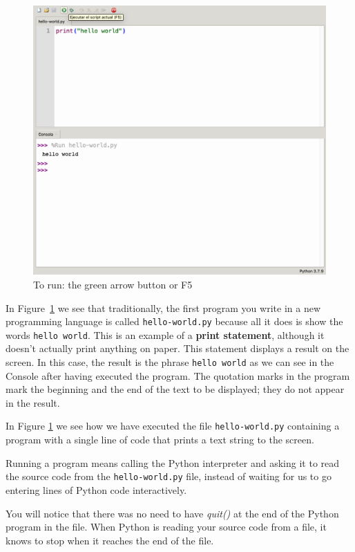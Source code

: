 \begin{figure}
    \centering
    \includegraphics[width=.85\textwidth]{images/Thonny-execute.png}
    \caption{To run: the green arrow button or F5}
    \label{fig:thonny-execute}
\end{figure}


In Figure~\ref{fig:thonny-execute} we see that traditionally, the first program you write in a new programming language is called \verb|hello-world.py| because all it does is show the words \verb|hello world|.  
This is an example of a \textbf{print statement}, although it doesn't actually print anything on paper. This statement displays a result on the screen. In this case, the result is the phrase \verb|hello world| as we can see in the Console after having executed the program.
The quotation marks in the program mark the beginning and the end of the text to be displayed; they do not appear in the result.




In Figure \ref{fig:thonny-execute} we see how we have executed the file \verb|hello-world.py| containing
a program with a single line of code that prints a text string to the screen.

Running a program means calling the Python interpreter and asking it to read the source code
from the \verb|hello-world.py| file, instead of waiting for us to go
entering lines of Python code interactively.

You will notice that there was no need to have \emph{quit()} at the end of the Python program in the file. When Python is reading your source code from a file, it knows to stop when it reaches the end of the file.

